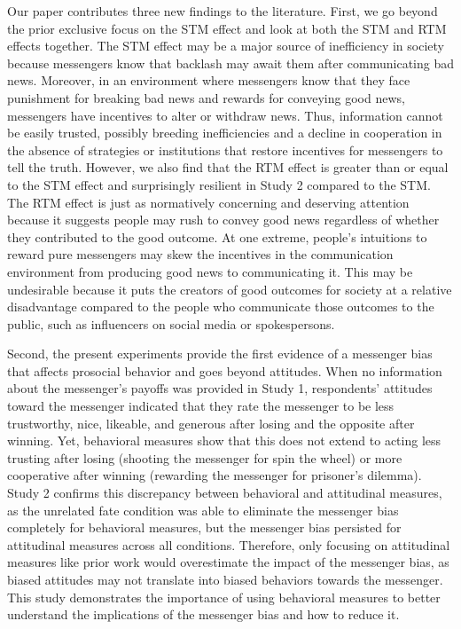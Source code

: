 Our paper contributes three new findings to the literature. First, we go
beyond the prior exclusive focus on the STM effect and look at both the
STM and RTM effects together. The STM effect may be a major source of
inefficiency in society because messengers know that backlash may await
them after communicating bad news. Moreover, in an environment where
messengers know that they face punishment for breaking bad news and
rewards for conveying good news, messengers have incentives to alter or
withdraw news. Thus, information cannot be easily trusted, possibly
breeding inefficiencies and a decline in cooperation in the absence of
strategies or institutions that restore incentives for messengers to
tell the truth. However, we also find that the RTM effect is greater
than or equal to the STM effect and surprisingly resilient in Study 2
compared to the STM. The RTM effect is just as normatively concerning
and deserving attention because it suggests people may rush to convey
good news regardless of whether they contributed to the good outcome. At
one extreme, people's intuitions to reward pure messengers may skew the
incentives in the communication environment from producing good news to
communicating it. This may be undesirable because it puts the creators
of good outcomes for society at a relative disadvantage compared to the
people who communicate those outcomes to the public, such as influencers
on social media or spokespersons.

Second, the present experiments provide the first evidence of a
messenger bias that affects prosocial behavior and goes beyond
attitudes. When no information about the messenger's payoffs was
provided in Study 1, respondents' attitudes toward the messenger
indicated that they rate the messenger to be less trustworthy, nice,
likeable, and generous after losing and the opposite after winning. Yet,
behavioral measures show that this does not extend to acting less
trusting after losing (shooting the messenger for spin the wheel) or
more cooperative after winning (rewarding the messenger for prisoner's
dilemma). Study 2 confirms this discrepancy between behavioral and
attitudinal measures, as the unrelated fate condition was able to
eliminate the messenger bias completely for behavioral measures, but the
messenger bias persisted for attitudinal measures across all conditions.
Therefore, only focusing on attitudinal measures like prior work would
overestimate the impact of the messenger bias, as biased attitudes may
not translate into biased behaviors towards the messenger. This study
demonstrates the importance of using behavioral measures to better
understand the implications of the messenger bias and how to reduce it.


